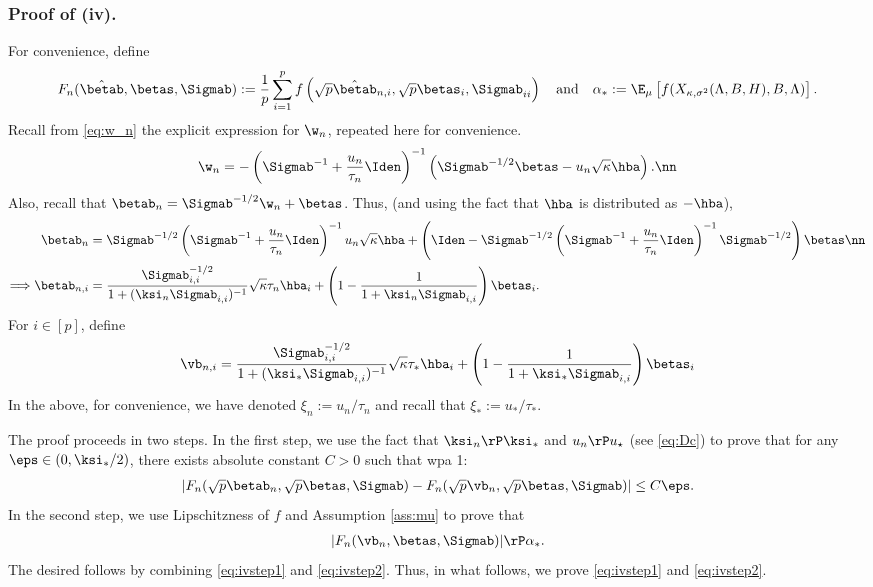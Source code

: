\vspace{5pt}
\subsubsection{Proof of (iv).}  For convenience, define 
$$F_n(\hat\betab,\betas,\Sigmab):=\frac{1}{p} \sum_{i=1}^{p} f\left(\sqrt{p}\hat\betab_{n,i},\sqrt{p}\betas_{i},\Sigmab_{ii}\right)\quad\text{and}\quad\alpha_*:=\E_\mu\left[f(X_{\kappa,\sigma^2}(\Lambda,B,H),B,\Lambda)\right].$$
Recall from \eqref{eq:w_n} the explicit expression for $\w_n$, repeated here for convenience.
\begin{align}
\w_n = -\left(\Sigmab^{-1}+\frac{u_n}{\tau_n}\Iden\right)^{-1}\left(\Sigmab^{-1/2}\betas-u_n\sqrt{\kappa}\hba\right).\nn
\end{align}
Also, recall that $\betab_n = \Sigmab^{-1/2}\w_n+\betas$. Thus,  (and using the fact that $\hba$ is distributed as $-\hba$),
\begin{align}
\betab_n &=\Sigmab^{-1/2}\left(\Sigmab^{-1}+\frac{u_n}{\tau_n}\Iden\right)^{-1}u_n\sqrt{\kappa}\hba + \left(\Iden-\Sigmab^{-1/2}\left(\Sigmab^{-1}+\frac{u_n}{\tau_n}\Iden\right)^{-1}\Sigmab^{-1/2}\right)\betas\nn\\
\Longrightarrow\betab_{n,i}&=\frac{{\Sigmab_{i,i}^{-1/2}}}{1+(\ksi_n\Sigmab_{i,i})^{-1}}\sqrt{\kappa}\tau_n\hba_i +\left(1-\frac{1}{1+\ksi_n\Sigmab_{i,i}}\right)\betas_i.\label{eq:betan}
\end{align}
For $i\in[p]$, define 
\begin{align}
\vb_{n,i} = \frac{{\Sigmab_{i,i}^{-1/2}}}{1+(\ksi_*\Sigmab_{i,i})^{-1}}\sqrt{\kappa}\tau_*\hba_i +\left(1-\frac{1}{1+\ksi_*\Sigmab_{i,i}}\right)\betas_i
\end{align}
In the above, for convenience, we have denoted $\xi_n:=u_n/\tau_n$ and recall that $\xi_*:=u_*/\tau_*$. 


The proof proceeds in two steps. In the first step, we use the fact that $\ksi_n\rP\ksi_*$ and $u_n\rP u_\star$ (see \eqref{eq:Dc}) to prove that for any $\eps\in(0,\ksi_*/2)$, there exists absolute constant $C>0$ such that wpa 1:
\begin{align}\label{eq:ivstep1}
|F_n(\sqrt{p}\betab_n,\sqrt{p}\betas,\Sigmab) - F_n(\sqrt{p}\vb_n,\sqrt{p}\betas,\Sigmab) | \leq C\eps.
\end{align}
In the second step, we use Lipschitzness of $f$ and Assumption \ref{ass:mu} to prove that 
\begin{align}
|F_n(\vb_n,\betas,\Sigmab)| \rP \alpha_*.\label{eq:ivstep2}
\end{align}
The desired follows by combining \eqref{eq:ivstep1} and \eqref{eq:ivstep2}. Thus, in what follows, we prove \eqref{eq:ivstep1} and \eqref{eq:ivstep2}.


